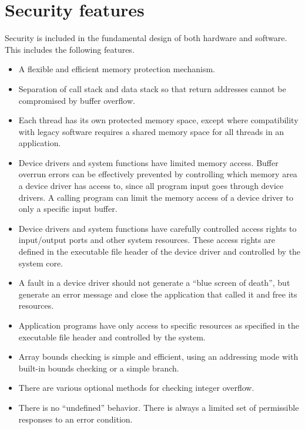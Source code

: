 \documentclass[forwardcom.tex]{subfiles}
\begin{document}
\section{Security features} \label{securityFeatures}
Security is included in the fundamental design of both hardware and software. This includes the following features.

\begin{itemize}
\item A flexible and efficient memory protection mechanism.

\item Separation of call stack and data stack so that return addresses cannot be compromised by buffer overflow.

\item Each thread has its own protected memory space, except where compatibility with legacy 
software requires a shared memory space for all threads in an application.

\item Device drivers and system functions have limited memory access. 
Buffer overrun errors can be effectively prevented by controlling which memory area a device driver has access to, since all program input goes through device drivers. A calling program can limit the memory access of a device driver to only a specific input buffer.

\item Device drivers and system functions have carefully controlled access rights to input/output ports and other system resources. These access rights are defined in the executable file header of the device driver and controlled by the system core.

\item A fault in a device driver should not generate a ``blue screen of death'', but generate an error message and close the application that called it and free its resources.

\item Application programs have only access to specific resources as specified in the executable file header and controlled by the system.

\item Array bounds checking is simple and efficient, using an addressing mode with built-in bounds checking or a simple branch.

\item There are various optional methods for checking integer overflow.

\item There is no ``undefined'' behavior. There is always a limited set of permissible responses to an error condition.
\end{itemize}
\end{document}
